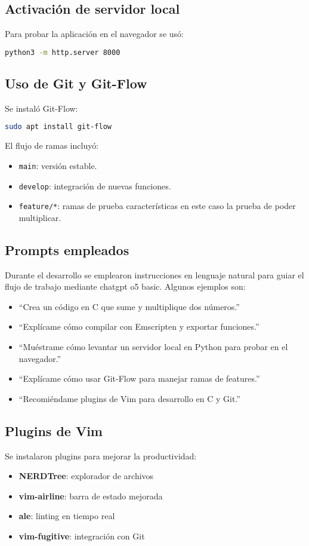 \documentclass[12pt,a4paper]{article}
\begin{document}
	\subsection{Activación de servidor local}
	Para probar la aplicación en el navegador se usó:
	\begin{lstlisting}[language=bash]
		python3 -m http.server 8000
	\end{lstlisting}
	
	\subsection{Uso de Git y Git-Flow}
	Se instaló Git-Flow:
	\begin{lstlisting}[language=bash]
		sudo apt install git-flow
	\end{lstlisting}
	
	El flujo de ramas incluyó:
	\begin{itemize}
		\item \texttt{main}: versión estable.
		\item \texttt{develop}: integración de nuevas funciones.
		\item \texttt{feature/*}: ramas de prueba características en este caso la prueba de poder multiplicar.
	\end{itemize}
	
	\subsection{Prompts empleados}
	Durante el desarrollo se emplearon instrucciones en lenguaje natural para guiar el flujo de trabajo mediante chatgpt o5 basic. Algunos ejemplos son:
	\begin{itemize}
		\item ``Crea un código en C que sume y multiplique dos números.''
		\item ``Explícame cómo compilar con Emscripten y exportar funciones.''
		\item ``Muéstrame cómo levantar un servidor local en Python para probar en el navegador.''
		\item ``Explícame cómo usar Git-Flow para manejar ramas de features.''
		\item ``Recomiéndame plugins de Vim para desarrollo en C y Git.''
	\end{itemize}
	
	\subsection{Plugins de Vim}
	Se instalaron plugins para mejorar la productividad:
	\begin{itemize}
		\item \textbf{NERDTree}: explorador de archivos
		\item \textbf{vim-airline}: barra de estado mejorada
		\item \textbf{ale}: linting en tiempo real
		\item \textbf{vim-fugitive}: integración con Git
	\end{itemize}
	
\end{document}
